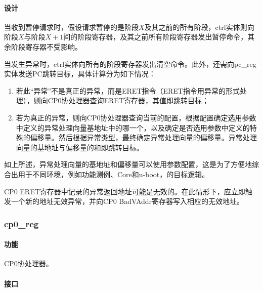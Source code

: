 \documentclass{article}
\begin{document}
\begin{spacing}{1.4}
\paragraph{设计}\mbox{}

当收到暂停请求时，假设请求暂停的是阶段$X$及其之前的所有阶段，ctrl实体则向阶段$X$与阶段$X+1$间的阶段寄存器，及其之前所有阶段寄存器发出暂停命令，其余阶段寄存器不受影响。

当发生异常时，ctrl实体向所有的阶段寄存器发出清空命令。此外，还需向pc\_reg实体发送PC跳转目标，具体计算分为如下情况：

\begin{enumerate}
    \item 若此“异常”不是真正的异常，而是ERET指令（ERET指令用异常的形式处理），则向CP0协处理器查询ERET寄存器，其值即跳转目标；
    \item 若为真正的异常，则向CP0协处理器查询当前的配置，根据配置确定选用参数中定义的异常处理向量基地址中的哪一个，以及确定是否选用参数中定义的特殊的偏移量。然后根据异常类型，最终确定异常处理向量的偏移量。异常处理向量的基地址与偏移量的和即跳转目标。
\end{enumerate}

如上所述，异常处理向量的基地址和偏移量可以使用参数配置，这是为了方便地综合出用于不同环境，例如功能测例、\textmu Core和u-boot，的目标逻辑。

CP0 ERET寄存器中记录的异常返回地址可能是无效的。在此情形下，应立即触发一个新的地址无效异常，并向CP0 BadVAddr寄存器写入相应的无效地址。

\subsubsection{cp0\_reg}

\paragraph{功能}\mbox{}

CP0协处理器。

\paragraph{接口}\mbox{}


\end{spacing}
\end{document}
